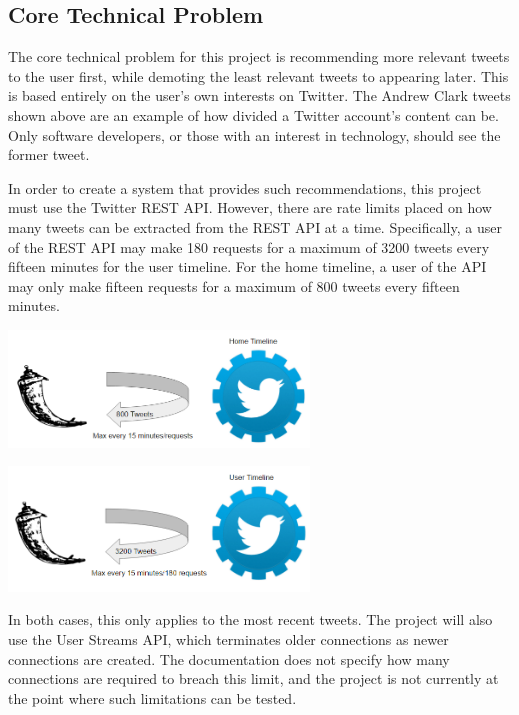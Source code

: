 \documentclass{article}
\begin{document}
\subsection{Core Technical Problem}

The core technical problem for this project is recommending more relevant tweets to the user first, while demoting the least relevant tweets to appearing later. This is based entirely on the user's own interests on Twitter. The Andrew Clark tweets shown above are an example of how divided a Twitter account's content can be. Only software developers, or those with an interest in technology, should see the former tweet.

In order to create a system that provides such recommendations, this project must use the Twitter REST API. However, there are rate limits placed on how many tweets can be extracted from the REST API at a time. Specifically, a user of the REST API may make 180 requests for a maximum of 3200 tweets every fifteen minutes for the user timeline. For the home timeline, a user of the API may only make fifteen requests for a maximum of 800 tweets every fifteen minutes. 

\includegraphics[width=0.6\textwidth,center]{rate_limit_1}

\includegraphics[width=0.6\textwidth,center]{rate_limit_2}

In both cases, this only applies to the most recent tweets. The project will also use the User Streams API, which terminates older connections as newer connections are created. The documentation does not specify how many connections are required to breach this limit, and the project is not currently at the point where such limitations can be tested.
\end{document}
